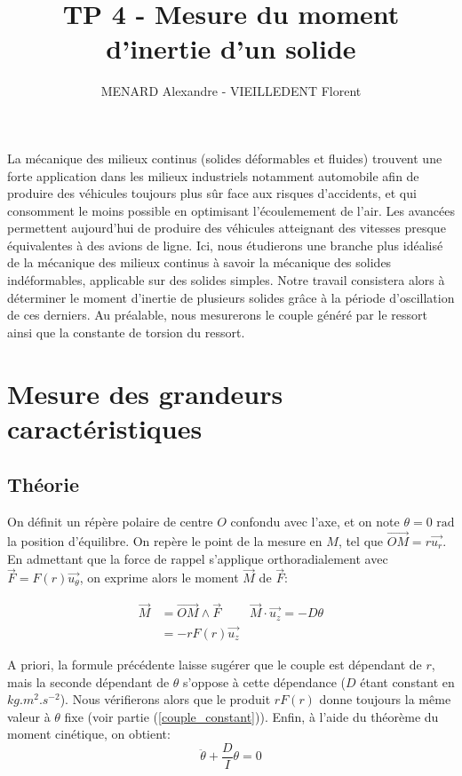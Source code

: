 \documentclass[12pt]{article}
\title{\vspace{-2cm}\textbf{TP 4 - Mesure du moment d'inertie d'un solide}}
\author{\vspace{-0.5cm}MENARD Alexandre - VIEILLEDENT Florent}
\date{\vspace{-0.7cm}}
\newcommand{\ut}{\vec{u_\theta}}
\newcommand{\ur}{\vec{u_r}}
\newcommand{\uz}{\vec{u_z}}
\begin{document}
\maketitle

La mécanique des milieux continus (solides déformables et fluides) trouvent une forte application dans les milieux industriels notamment automobile afin de produire
des véhicules toujours plus sûr face aux risques d'accidents, et qui consomment le moins possible en optimisant l'écoulemement de l'air. Les avancées permettent aujourd'hui
de produire des véhicules atteignant des vitesses presque équivalentes à des avions de ligne. Ici, nous étudierons une branche plus idéalisé de la mécanique des milieux continus à savoir la mécanique des solides
indéformables, applicable sur des solides simples. Notre travail consistera alors à déterminer le moment d'inertie de plusieurs solides grâce à la période d'oscillation de ces derniers. Au préalable,
nous mesurerons le couple généré par le ressort ainsi que la constante de torsion du ressort.


\section{Mesure des grandeurs caractéristiques}
\subsection{Théorie}
On définit un répère polaire de centre $O$ confondu avec l'axe, et on note $\theta=0 \text{ rad}$ la position d'équilibre. On repère le point
de la mesure en $M$, tel que $\vec{OM} = r\ur$. En admettant que la force de rappel
s'applique orthoradialement avec $\vec{F} = F(r) \ut$, on exprime alors le moment $\vec{M}$ de $\vec{F}$:

\begin{align}
    \vec{M} & = \vec{OM} \wedge \vec{F} & \vec{M} \cdot \uz = -D\theta \\
            & = -rF(r) \uz \nonumber
    \label{eqn:moment_ressort}
\end{align}

A priori, la formule précédente laisse sugérer que le couple est dépendant de $r$, mais la seconde dépendant de $\theta$
s'oppose à cette dépendance ($D$ étant constant en $kg.m^2.s^{-2}$). Nous vérifierons alors que le produit $rF(r)$ donne toujours la même valeur à $\theta$ fixe (voir partie (\ref{couple_constant})).
Enfin, à l'aide du théorème du moment cinétique, on obtient:
\begin{equation}
    \label{eqn:equa_diff}
    \ddot \theta + \frac{D}{I}\theta = 0
\end{equation}
\end{document}
